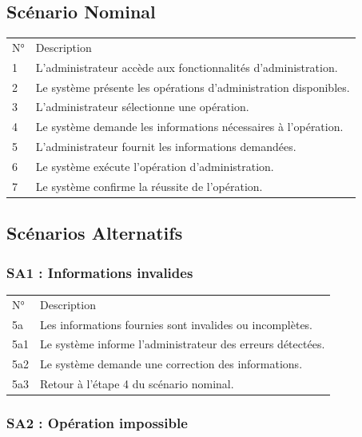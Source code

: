 \documentclass[
]{book}
\begin{document}
\hypertarget{scuxe9nario-nominal-6}{%
\subsection{Scénario Nominal}\label{scuxe9nario-nominal-6}}

\begin{longtable}[]{@{}ll@{}}
\toprule
\endhead
N° & Description \\
1 & L'administrateur accède aux fonctionnalités d'administration. \\
2 & Le système présente les opérations d'administration disponibles. \\
3 & L'administrateur sélectionne une opération. \\
4 & Le système demande les informations nécessaires à l'opération. \\
5 & L'administrateur fournit les informations demandées. \\
6 & Le système exécute l'opération d'administration. \\
7 & Le système confirme la réussite de l'opération. \\
\bottomrule
\end{longtable}

\hypertarget{scuxe9narios-alternatifs-6}{%
\subsection{Scénarios Alternatifs}\label{scuxe9narios-alternatifs-6}}

\hypertarget{sa1-informations-invalides-1}{%
\subsubsection{SA1 : Informations
invalides}\label{sa1-informations-invalides-1}}

\begin{longtable}[]{@{}ll@{}}
\toprule
\endhead
N° & Description \\
5a & Les informations fournies sont invalides ou incomplètes. \\
5a1 & Le système informe l'administrateur des erreurs détectées. \\
5a2 & Le système demande une correction des informations. \\
5a3 & Retour à l'étape 4 du scénario nominal. \\
\bottomrule
\end{longtable}

\hypertarget{sa2-opuxe9ration-impossible}{%
\subsubsection{SA2 : Opération
impossible}\label{sa2-opuxe9ration-impossible}}
\end{document}
